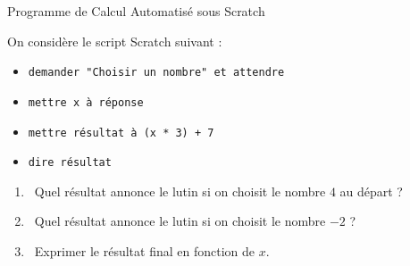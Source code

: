 \begin{exercice}[3 pts][\capAnalyser]{Programme de Calcul Automatisé sous Scratch}
\noindent
\begin{minipage}[c]{0.58\linewidth}
On considère le script Scratch suivant :
\begin{itemize}[leftmargin=1.2em, itemsep=1pt]
    \item \texttt{demander "Choisir un nombre" et attendre}
    \item \texttt{mettre x à réponse}
    \item \texttt{mettre résultat à (x * 3) + 7}
    \item \texttt{dire résultat}
\end{itemize}
\begin{enumerate}[leftmargin=1.2em, itemsep=1pt]
    \item \capRealiser\ Quel résultat annonce le lutin si on choisit le nombre $4$ au départ ?
    \item \capAnalyser\ Quel résultat annonce le lutin si on choisit le nombre $-2$ ?
    \item \capValider\ Exprimer le résultat final en fonction de $x$.
\end{enumerate}
\end{minipage}\hfill
\begin{minipage}[c]{0.38\linewidth}
\centering
{}
\end{minipage}

\vspace{1mm}
\lignesreponse[2]
\end{exercice}

